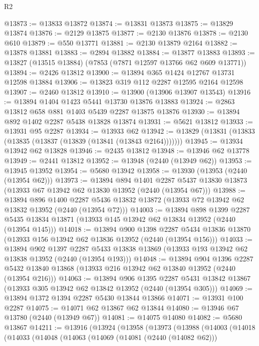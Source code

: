 \begin{lexlean}{R2}
\begin{coremodule}
@13873 := @13833 @13872
@13874 := @13831 @13873
@13875 := @13829 @13874
@13876 := @2129 @13875
@13877 := @2130 @13876
@13878 := @2130 @610
@13879 := @550 @13771
@13881 := @2130 @13879 @2164
@13882 := @13878 @13881
@13883 := @2894 @13882
@13884 := @13877 @13883
@13893 := @13827 (@13515 @13884) (@7853 (@7871 @12597 @13766 @62 @609 @13771))
@13894 := @2426 @13812
@13900 := @13894 @365 @1424 @12767 @13731 @12598 @13884
@13906 := @13823 @319 @112 @2287 @12595 @2164 @12598
@13907 := @2460 @13812
@13910 := @13900 (@13906 @13907 @13543)
@13916 := @13894 @1404 @1423 @5441 @13730 @13876 @13883
@13924 := @2863 @13812 @658 @881 @1403 @5439 @2287 @13875 @13876
@13930 := @13894 @892 @1402 @2287 @5438 @13828 @13874
@13931 := @5621 @13812
@13933 := @13931 @95 @2287
@13934 := @13933 @62
@13942 := @13829 (@13831 (@13833 (@13835 (@13837 (@13839 (@13841 (@13843 @2164)))))))
@13945 := @13934 @13942 @62 @13828
@13946 := @2435 @13812
@13948 := @13946 @62 @13778
@13949 := @2441 @13812
@13952 := @13948 (@2440 (@13949 @62))
@13953 := @13945 @13952
@13954 := @5680 @13942
@13958 := @13930 (@13953 (@2440 (@13954 @62)))
@13973 := @13894
    @894
    @1401
    @2287
    @5437
    @13830
    @13873
    (@13933 @67 @13942 @62 @13830 @13952 (@2440 (@13954 @67)))
@13988 := @13894
    @896
    @1400
    @2287
    @5436
    @13832
    @13872
    (@13933 @72 @13942 @62 @13832 @13952 (@2440 (@13954 @72)))
@14003 := @13894
    @898
    @1399
    @2287
    @5435
    @13834
    @13871
    (@13933 @145 @13942 @62 @13834 @13952 (@2440 (@13954 @145)))
@14018 := @13894
    @900
    @1398
    @2287
    @5434
    @13836
    @13870
    (@13933 @156 @13942 @62 @13836 @13952 (@2440 (@13954 @156)))
@14033 := @13894
    @902
    @1397
    @2287
    @5433
    @13838
    @13869
    (@13933 @193 @13942 @62 @13838 @13952 (@2440 (@13954 @193)))
@14048 := @13894
    @904
    @1396
    @2287
    @5432
    @13840
    @13868
    (@13933 @216 @13942 @62 @13840 @13952 (@2440 (@13954 @216)))
@14063 := @13894
    @906
    @1395
    @2287
    @5431
    @13842
    @13867
    (@13933 @305 @13942 @62 @13842 @13952 (@2440 (@13954 @305)))
@14069 := @13894 @1372 @1394 @2287 @5430 @13844 @13866
@14071 := @13931 @100 @2287
@14075 := @14071 @62 @13867 @62 @13844
@14080 := @13946 @67 @13780 (@2440 (@13949 @67))
@14081 := @14075 @14080
@14082 := @5680 @13867
@14211 := @13916
    (@13924
      (@13958
        (@13973
          (@13988
            (@14003
              (@14018
                (@14033
                  (@14048
                    (@14063
                      (@14069
                        (@14081 (@2440 (@14082 @62)))

\end{coremodule}
\end{lexlean}
